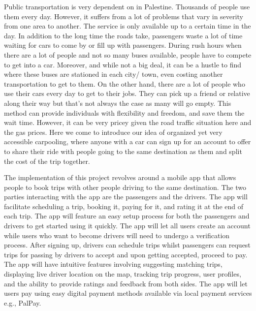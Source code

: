 \documentclass[a4paper, 12pt]{report} %
\begin{document}
            Public transportation is very dependent on in Palestine. Thousands of people use them every day. However, it suffers from a lot of problems that vary in severity from one area to another. The service is only available up to a certain time in the day. In addition to the long time the roads take, passengers waste a lot of time waiting for cars to come by or fill up with passengers. During rush hours when there are a lot of people and not so many buses available, people have to compete to get into a car. Moreover, and while not a big deal, it can be a hustle to find where these buses are stationed in each city/ town, even costing another transportation to get to them. On the other hand, there are a lot of people who use their cars every day to get to their jobs. They can pick up a friend or relative along their way but that's not always the case as many will go empty. This method can provide individuals with flexibility and freedom, and save them the wait time. However, it can be very pricey given the road traffic situation here and the gas prices. Here we come to introduce our idea of organized yet very accessible carpooling, where anyone with a car can sign up for an account to offer to share their ride with people going to the same destination as them and split the cost of the trip together. 

            The implementation of this project revolves around a mobile app that allows people to book trips with other people driving to the same destination. The two parties interacting with the app are the passengers and the drivers. The app will facilitate scheduling a trip, booking it, paying for it, and rating it at the end of each trip. The app will feature an easy setup process for both the passengers and drivers to get started using it quickly. The app will let all users create an account while users who want to become drivers will need to undergo a verification process. After signing up, drivers can schedule trips whilst passengers can request trips for passing by drivers to accept and upon getting accepted, proceed to pay. The app will have intuitive features involving suggesting matching trips, displaying live driver location on the map, tracking trip progress, user profiles, and the ability to provide ratings and feedback from both sides. The app will let users pay using easy digital payment methods available via local payment services e.g., PalPay. 
        
\end{document}
